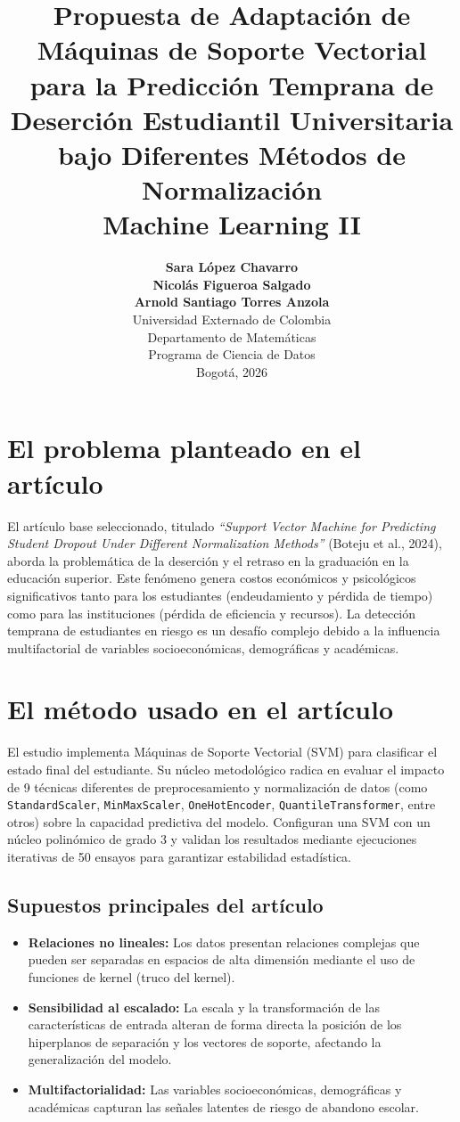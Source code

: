 \documentclass[12pt,a4paper]{article}
\title{\textbf{\Large Propuesta de Adaptación de Máquinas de Soporte Vectorial para la Predicción Temprana de Deserción Estudiantil Universitaria bajo Diferentes Métodos de Normalización} \\
\vspace{0.3cm}
\large Machine Learning II}
\author{
    \textbf{Sara López Chavarro} \\
    \textbf{Nicolás Figueroa Salgado} \\
    \textbf{Arnold Santiago Torres Anzola} \\[0.4cm]
    \small Universidad Externado de Colombia \\
    \small Departamento de Matemáticas \\
    \small Programa de Ciencia de Datos \\
    \small Bogotá, 2026
}
\date{}
\begin{document}
\maketitle

\vspace{0.3cm}

\section{El problema planteado en el artículo}

El artículo base seleccionado, titulado \textit{``Support Vector Machine for Predicting Student Dropout Under Different Normalization Methods''} (Boteju et al., 2024), aborda la problemática de la deserción y el retraso en la graduación en la educación superior. Este fenómeno genera costos económicos y psicológicos significativos tanto para los estudiantes (endeudamiento y pérdida de tiempo) como para las instituciones (pérdida de eficiencia y recursos). La detección temprana de estudiantes en riesgo es un desafío complejo debido a la influencia multifactorial de variables socioeconómicas, demográficas y académicas.

\section{El método usado en el artículo}

El estudio implementa Máquinas de Soporte Vectorial (SVM) para clasificar el estado final del estudiante. Su núcleo metodológico radica en evaluar el impacto de 9 técnicas diferentes de preprocesamiento y normalización de datos (como \texttt{StandardScaler}, \texttt{MinMaxScaler}, \texttt{OneHotEncoder}, \texttt{QuantileTransformer}, entre otros) sobre la capacidad predictiva del modelo. Configuran una SVM con un núcleo polinómico de grado 3 y validan los resultados mediante ejecuciones iterativas de 50 ensayos para garantizar estabilidad estadística.

\subsection{Supuestos principales del artículo}
\begin{itemize}
    \item \textbf{Relaciones no lineales:} Los datos presentan relaciones complejas que pueden ser separadas en espacios de alta dimensión mediante el uso de funciones de kernel (truco del kernel).
    \item \textbf{Sensibilidad al escalado:} La escala y la transformación de las características de entrada alteran de forma directa la posición de los hiperplanos de separación y los vectores de soporte, afectando la generalización del modelo.
    \item \textbf{Multifactorialidad:} Las variables socioeconómicas, demográficas y académicas capturan las señales latentes de riesgo de abandono escolar.
\end{itemize}
\end{document}

